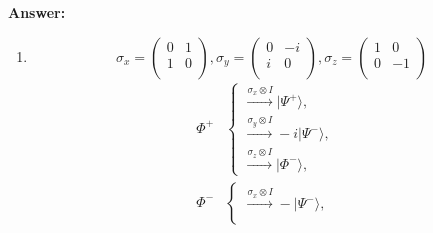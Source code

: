 \documentclass[english,aps,onecolumn]{revtex4-1}
\begin{document}
\begin{enumerate}[1.]
 \textbf{Answer:}\\
 \begin{enumerate}[(1)]
   \item \begin{equation} \sigma_x=\left(
                                                          \begin{array}{cc}
                                                            0 & 1 \\
                                                            1 & 0 \\
                                                          \end{array}
                                                        \right)
, \sigma_y=\left(
                                                          \begin{array}{cc}
                                                           0 & -i \\
                                                            i & 0 \\
                                                          \end{array}
                                                        \right), \sigma_z=\left(
                                                          \begin{array}{cc}
                                                            1 & 0 \\
                                                            0 & -1 \\
                                                          \end{array}
                                                        \right)
\end{equation}
  \begin{equation}
  \begin{split}
  \Phi^+ &\left\{
          \begin{array}{ll}
             \xrightarrow{\sigma_x\otimes I}  |\Psi^+\rangle, &  \\
             \xrightarrow{\sigma_y\otimes I}  -i|\Psi^-\rangle, & \\
             \xrightarrow{\sigma_z\otimes I}  |\Phi^-\rangle, &
          \end{array}
        \right.               \\
  \Phi^- &\left\{
          \begin{array}{ll}
             \xrightarrow{\sigma_x\otimes I}  -|\Psi^-\rangle, &  \\

\end{array}
\end{split}
\end{equation}
\end{enumerate}
\end{enumerate}
\end{document}
